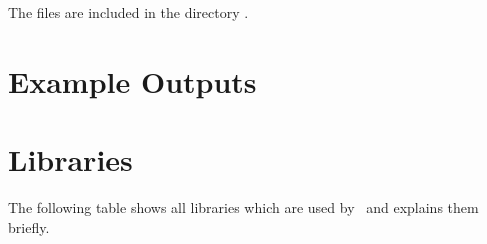 The files are included in the directory \file{\aspectJBookstoreApplicationDirDistro{}/}.
      \setXMLListing
           
      

\newpage
\chapter{Example \KiekerTraceAnalysis{} Outputs}

  

\chapter{Libraries}
    The following table shows all libraries which are used by \Kieker\ and explains them briefly.
    

